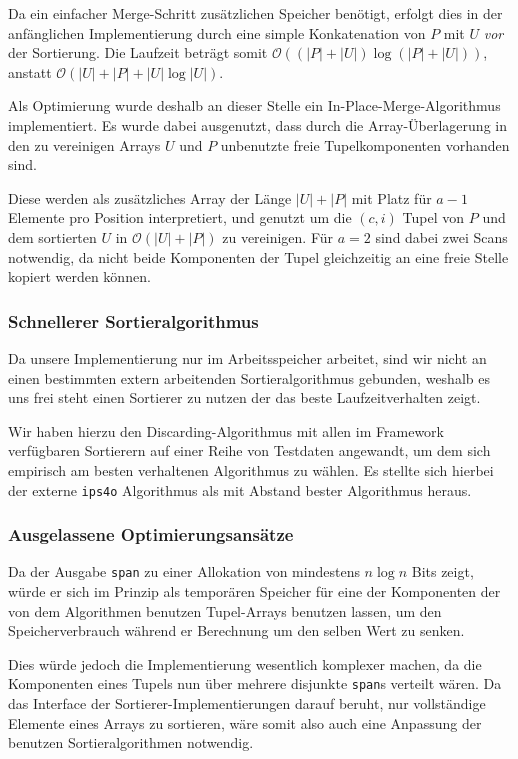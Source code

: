 Da ein einfacher Merge-Schritt zusätzlichen Speicher benötigt, erfolgt dies in der anfänglichen Implementierung durch eine simple Konkatenation von $P$ mit $U$ \textit{vor} der Sortierung. Die Laufzeit beträgt somit $\mathcal{O}( (|P| + |U|) \log (|P| + |U|))$, anstatt $\mathcal{O}( |U| + |P| + |U| \log |U|)$.

Als Optimierung wurde deshalb an dieser Stelle ein In-Place-Merge-Algorithmus implementiert. Es wurde dabei ausgenutzt, dass durch die Array-Überlagerung in den zu vereinigen Arrays $U$ und $P$ unbenutzte freie Tupelkomponenten vorhanden sind.

Diese werden als zusätzliches Array der Länge $|U| + |P|$ mit Platz für $a - 1$ Elemente pro Position interpretiert, und genutzt um die $(c, i)$ Tupel von $P$ und dem sortierten $U$ in $\mathcal{O}( |U| + |P|)$ zu vereinigen. Für $a=2$ sind dabei zwei Scans notwendig, da nicht beide Komponenten der Tupel gleichzeitig an eine freie Stelle kopiert werden können.

\subsubsection{Schnellerer Sortieralgorithmus}

Da unsere Implementierung nur im Arbeitsspeicher arbeitet, sind wir nicht an einen bestimmten extern arbeitenden Sortieralgorithmus gebunden, weshalb es uns frei steht einen Sortierer zu nutzen der das beste Laufzeitverhalten zeigt.

Wir haben hierzu den Discarding-Algorithmus mit allen im Framework verfügbaren Sortierern auf einer Reihe von Testdaten angewandt, um dem sich empirisch am besten verhaltenen Algorithmus zu wählen. Es stellte sich hierbei der externe \texttt{ips4o}  Algorithmus als mit Abstand bester Algorithmus heraus.


\subsubsection{Ausgelassene Optimierungsansätze}

Da der Ausgabe \texttt{span} zu einer Allokation von mindestens $n \log n$ Bits zeigt, würde er sich im Prinzip als temporären Speicher für eine der Komponenten der von dem Algorithmen benutzen Tupel-Arrays benutzen lassen, um den Speicherverbrauch während er Berechnung um den selben Wert zu senken. 


Dies würde jedoch die Implementierung wesentlich komplexer machen, da die Komponenten eines Tupels nun über mehrere disjunkte \texttt{span}s verteilt wären. Da das Interface der Sortierer-Implementierungen darauf beruht, nur vollständige Elemente eines Arrays zu sortieren, wäre somit also auch eine Anpassung der benutzen Sortieralgorithmen notwendig.
